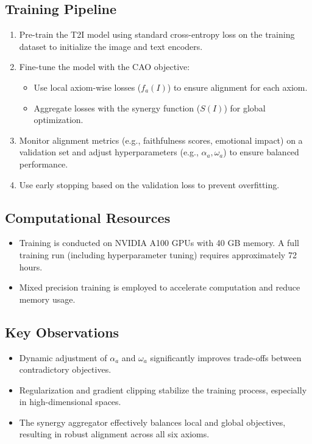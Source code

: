 \subsection{Training Pipeline}
\begin{enumerate}
    \item Pre-train the T2I model using standard cross-entropy loss on the training dataset to initialize the image and text encoders.  
    \item Fine-tune the model with the CAO objective:
    \begin{itemize}
        \item Use local axiom-wise losses (\(f_a(I)\)) to ensure alignment for each axiom.  
        \item Aggregate losses with the synergy function (\(S(I)\)) for global optimization.  
    \end{itemize}
    \item Monitor alignment metrics (e.g., faithfulness scores, emotional impact) on a validation set and adjust hyperparameters (e.g., \(\alpha_a, \omega_a\)) to ensure balanced performance.  
    \item Use early stopping based on the validation loss to prevent overfitting.  
\end{enumerate}

\subsection{Computational Resources}
\begin{itemize}
    \item Training is conducted on NVIDIA A100 GPUs with 40 GB memory. A full training run (including hyperparameter tuning) requires approximately 72 hours.  
    \item Mixed precision training is employed to accelerate computation and reduce memory usage.  
\end{itemize}

\subsection{Key Observations}
\begin{itemize}
    \item Dynamic adjustment of \(\alpha_a\) and \(\omega_a\) significantly improves trade-offs between contradictory objectives.  
    \item Regularization and gradient clipping stabilize the training process, especially in high-dimensional spaces.  
    \item The synergy aggregator effectively balances local and global objectives, resulting in robust alignment across all six axioms.  
\end{itemize}



